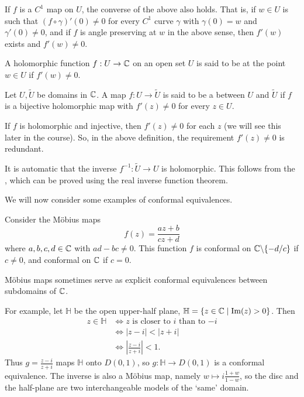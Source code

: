\documentclass[a4paper]{scrartcl}
\begin{document}
\begin{remark}
    If $f$ is a $C^1$ map on $U$, the converse of the above also holds. That is, if $w \in U$ is such that $(f \circ \gamma)'(0) \neq 0$ for every $C^1$ curve $\gamma$ with $\gamma(0) = w$ and $\gamma'(0) \neq 0$, and if $f$ is angle preserving at $w$ in the above sense, then $f'(w)$ exists and $f'(w) \neq 0$.
\end{remark}

\begin{definition}[Conformal]
    A holomorphic function $f: U \rightarrow \mathbb{C}$ on an open set $U$ is said to be  at the point $w \in U$ if $f'(w) \neq 0$.
\end{definition}

\begin{definition}
    Let $U, \tilde{U}$ be domains in $\mathbb{C}$. A map $f: U \rightarrow \tilde{U}$ is said to be a  between $U$ and $\tilde{U}$ if $f$ is a bijective holomorphic map with $f'(z) \neq 0$ for every $z \in U$.
\end{definition}

\begin{remark}[Redundancy]
    If $f$ is holomorphic and injective, then $f'(z) \neq 0$ for each $z$ (we will see this later in the course). So, in the above definition, the requirement $f'(z) \neq 0$ is redundant.
\end{remark}

\begin{remark}
    It is automatic that the inverse $f^{-1}: \tilde{U} \rightarrow U$ is holomorphic. This follows from the , which can be proved using the real inverse function theorem.
\end{remark}

We will now consider some examples of conformal equivalences.

\begin{example}
    Consider the Möbius maps
    $$
f(z) = \frac{az + b}{cz + d}
    $$
    where $a, b, c, d \in \mathbb{C}$ with $ad - bc \neq 0$. This function $f$ is conformal on $\mathbb{C} \backslash \{-d/c\}$ if $c \neq 0$, and conformal on $\mathbb{C}$ if $c = 0$.

    Möbius maps sometimes serve as explicit conformal equivalences between subdomains of $\mathbb{C}$.

    For example, let $\mathbb{H}$ be the open upper-half plane, $\mathbb{H} = \{z \in \mathbb{C} \mid \operatorname{Im}(z) > 0\}$. Then
    \begin{align*}
        z \in \mathbb{H} &\iff z \text{ is closer to $i$ than to $-i$} \\
&\iff |z - i| < |z + i| \\
&\iff \left|\frac{z - i}{z + i}\right| < 1.
    \end{align*}
    Thus $g = \frac{z - i}{z + i}$ maps $\mathbb{H}$ onto $D(0, 1)$, so $g: \mathbb{H} \rightarrow D(0, 1)$ is a conformal equivalence. The inverse is also a Möbius map, namely $w \mapsto i\frac{1 + w}{1 - w}$, so the disc and the half-plane are two interchangeable models of the `same' domain.
\end{example}
\end{document}
